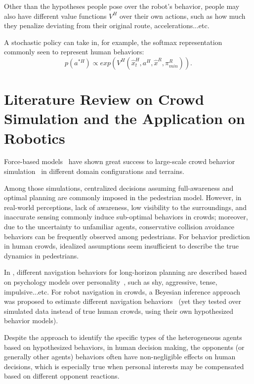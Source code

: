 \documentclass{article}
\begin{document}
Other than the hypotheses people pose over the robot's behavior, people may also have different value functions $V^H$ over their own actions, such as how much they penalize deviating from their original route, accelerations...etc.

A stochastic policy can take in, for example, the softmax representation commonly seen to represent human behaviors:
\begin{equation}
p(a^{*H}) \propto exp( V^H(\hat{x}^H_t, a^H ,\hat{x}^R,\pi^R_{min})).
\end{equation}

\section{Literature Review on Crowd Simulation and the Application on Robotics}
Force-based models~\cite{helbing1995social, reynolds1987flocks} have shown great success to large-scale crowd behavior simulation~\cite{treuille2006continuum, pelechano2007controlling} in different domain configurations and terrains.

Among those simulations, centralized decisions assuming full-awareness and optimal planning are commonly imposed in the pedestrian model. However, in real-world perceptions, lack of awareness, low visibility to the surroundings, and inaccurate sensing commonly induce sub-optimal behaviors in crowds; moreover, due to the uncertainty to unfamiliar agents, conservative collision avoidance behaviors can be frequently observed among pedestrians. For behavior prediction in human crowds, idealized assumptions seem insufficient to describe the true dynamics in pedestrians. 

In \cite{guy2011simulating}, different navigation behaviors for long-horizon planning are described based on psychology models over personality~\cite{eysenck1985personality}, such as shy, aggressive, tense, impulsive...etc. For robot navigation in crowds, a Beyesian inference approach was proposed to estimate different navigation behaviors~\cite{godoy2016moving} (yet they tested over simulated data instead of true human crowds, using their own hypothesized behavior models).

Despite the approach to identify the specific types of the heterogeneous agents based on hypothesized behaviors, in human decision making, the opponents (or generally other agents) behaviors often have non-negligible effects on human decisions, which is especially true when personal interests may be compensated based on different opponent reactions.
\end{document}
